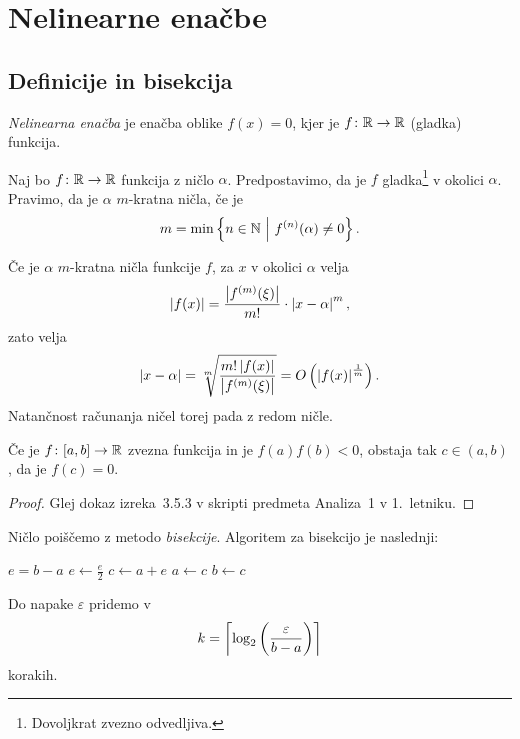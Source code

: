 \section{Nelinearne enačbe}

\subsection{Definicije in bisekcija}

\begin{definicija}
\emph{Nelinearna enačba} je enačba oblike
$f(x) = 0$, kjer je $f \colon \mathbb{R} \to \mathbb{R}$ (gladka) funkcija.
\end{definicija}

\begin{definicija}
Naj bo $f \colon \mathbb{R} \to \mathbb{R}$ funkcija z ničlo $\alpha$.
Predpostavimo, da je $f$ gladka\footnote{Dovoljkrat zvezno
odvedljiva.} v okolici $\alpha$. Pravimo, da je $\alpha$ $m$-kratna
ničla, če je
\[
m = \min \left\{n \in \mathbb{N}~\middle\vert~f^{(n)}(\alpha) \ne 0\right\}.
\]
\end{definicija}

\begin{opomba}
Če je $\alpha$ $m$-kratna ničla funkcije $f$, za $x$ v okolici
$\alpha$ velja
\[
\left\lvert f(x)\right\rvert =
\frac{\left\lvert f^{(m)}(\xi)\right\rvert}{m!} \cdot \left\lvert x - \alpha\right\rvert^m,
\]
zato velja
\[
\left\lvert x - \alpha\right\rvert =
\sqrt[m]{\frac{m! \left\lvert f(x)\right\rvert}{\left\lvert f^{(m)}(\xi)\right\rvert}} =
O \left(\left\lvert f(x)\right\rvert^{\frac{1}{m}}\right).
\]
Natančnost računanja ničel torej pada z redom ničle.
\end{opomba}

\begin{izrek}
Če je $f \colon [a, b] \to \mathbb{R}$ zvezna funkcija in je
$f(a) f(b) < 0$, obstaja tak $c \in (a, b)$, da je $f(c) = 0$.
\end{izrek}

\begin{proof}
Glej dokaz izreka~3.5.3 v skripti predmeta Analiza~1 v 1.~letniku.
\end{proof}

\begin{opomba}
Ničlo poiščemo z metodo
\emph{bisekcije}. Algoritem za
bisekcijo je naslednji:
\begin{algorithmic}[1]
\State $e = b - a$
  \State $e \gets \frac{e}{2}$
  \State $c \gets a + e$
  	\State $a \gets c$
  \Else
  	\State $b \gets c$
  \EndIf
\EndWhile
\end{algorithmic}
Do napake $\varepsilon$ pridemo v
\[
k = \left\lceil \log_2 \left(\frac{\varepsilon}{b-a}\right)\right\rceil
\]
korakih.
\end{opomba}

